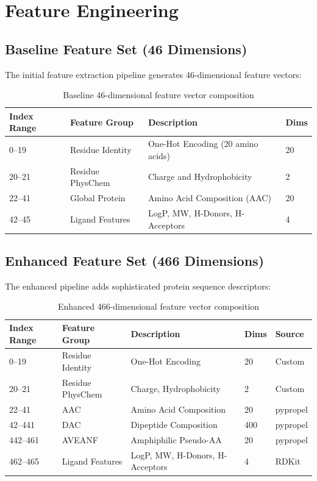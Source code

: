 \documentclass[11pt,a4paper]{article}
\begin{document}
\section{Feature Engineering}

\subsection{Baseline Feature Set (46 Dimensions)}
The initial feature extraction pipeline generates 46-dimensional feature vectors:

\begin{table}[h]
\centering
\begin{tabular}{@{}llll@{}}
\toprule
\textbf{Index Range} & \textbf{Feature Group} & \textbf{Description} & \textbf{Dims} \\ \midrule
0--19 & Residue Identity & One-Hot Encoding (20 amino acids) & 20 \\
20--21 & Residue PhysChem & Charge and Hydrophobicity & 2 \\
22--41 & Global Protein & Amino Acid Composition (AAC) & 20 \\
42--45 & Ligand Features & LogP, MW, H-Donors, H-Acceptors & 4 \\ \bottomrule
\end{tabular}
\caption{Baseline 46-dimensional feature vector composition}
\end{table}

\subsection{Enhanced Feature Set (466 Dimensions)}
The enhanced pipeline adds sophisticated protein sequence descriptors:

\begin{table}[h]
\centering
\begin{tabular}{@{}lllll@{}}
\toprule
\textbf{Index Range} & \textbf{Feature Group} & \textbf{Description} & \textbf{Dims} & \textbf{Source} \\ \midrule
0--19 & Residue Identity & One-Hot Encoding & 20 & Custom \\
20--21 & Residue PhysChem & Charge, Hydrophobicity & 2 & Custom \\
22--41 & AAC & Amino Acid Composition & 20 & pypropel \\
42--441 & DAC & Dipeptide Composition & 400 & pypropel \\
442--461 & AVEANF & Amphiphilic Pseudo-AA & 20 & pypropel \\
462--465 & Ligand Features & LogP, MW, H-Donors, H-Acceptors & 4 & RDKit \\ \bottomrule
\end{tabular}
\caption{Enhanced 466-dimensional feature vector composition}
\end{table}
\end{document}
